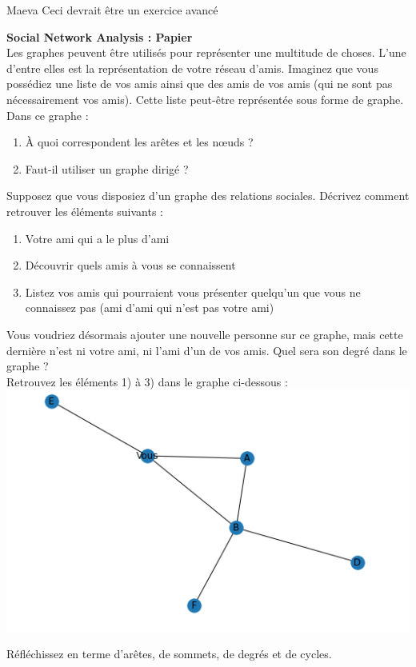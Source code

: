 \begin{note}{Maeva}
    Ceci devrait être un exercice avancé
\end{note}
\begin{Exercice}[10 minutes] \textbf{Social Network Analysis : Papier}\\
    Les graphes peuvent être utilisés pour représenter une multitude de choses.  L'une d'entre elles est la représentation de votre réseau d'amis. Imaginez que vous possédiez une liste de vos amis ainsi que des amis de vos amis (qui ne sont pas nécessairement vos amis). Cette liste peut-être représentée sous forme de graphe. Dans ce graphe :\\
    \begin{enumerate}
        \item  À quoi correspondent les arêtes et les nœuds ? 
        \item Faut-il utiliser un graphe dirigé ?
    \end{enumerate}
    Supposez que vous disposiez d'un graphe des relations sociales. Décrivez comment retrouver les éléments suivants :
    \begin{enumerate}
        \item Votre ami qui a le plus d'ami
        \item Découvrir quels amis à vous se connaissent
        \item Listez vos amis qui pourraient vous présenter quelqu'un que vous ne connaissez pas (ami d'ami qui n'est pas votre ami)
    \end{enumerate}
    Vous voudriez désormais ajouter une nouvelle personne sur ce graphe, mais cette dernière n'est ni votre ami, ni l'ami d'un de vos amis. Quel sera son degré dans le graphe ?\\
    
    Retrouvez les éléments 1) à 3) dans le graphe ci-dessous :\\
    \includegraphics[]{Network1.PNG}
    \begin{conseil}
        Réfléchissez en terme d'arêtes, de sommets, de degrés et de cycles.
    \end{conseil}


\end{Exercice}

